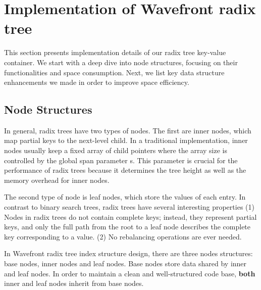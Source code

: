 \documentclass[sigplan,screen,nonacm]{acmart}
\begin{document}
\section{Implementation of Wavefront radix tree}
This section presents implementation details of our radix tree key-value container. We start with a deep dive into node structures, focusing on their functionalities and space consumption. Next, we list key data structure enhancements we made in order to improve space efficiency.

\subsection{Node Structures}
In general, radix trees have two types of nodes. The first are inner nodes, which map partial keys to the next-level child. In a traditional implementation, inner nodes usually keep a fixed array of child pointers where the array size is controlled by the global span parameter s. This parameter is crucial for the performance of radix trees because it determines the tree height as well as the memory overhead for inner nodes. 

The second type of node is leaf nodes, which store the values of each entry. In contrast to binary search trees, radix trees have several interesting properties (1) Nodes in radix trees do not contain complete keys; instead, they represent partial keys, and only the full path from the root to a leaf node describes the complete key corresponding to a value. (2) No rebalancing operations are ever needed. 

In Wavefront radix tree index structure design, there are three nodes structures:  base nodes, inner nodes and leaf nodes. Base nodes store data shared by inner and leaf nodes. In order to maintain a clean and well-structured code base, \textbf{both} inner and leaf nodes inherit from base nodes. 
\end{document}
